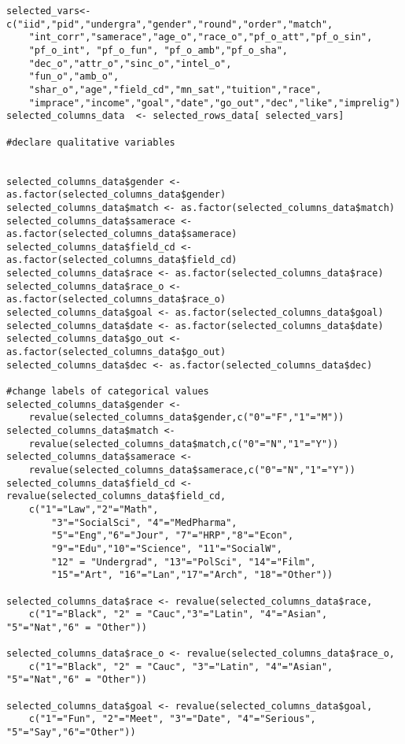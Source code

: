 \begin{verbatim}
selected_vars<-c("iid","pid","undergra","gender","round","order","match",
    "int_corr","samerace","age_o","race_o","pf_o_att","pf_o_sin",
    "pf_o_int", "pf_o_fun", "pf_o_amb","pf_o_sha",
    "dec_o","attr_o","sinc_o","intel_o",
    "fun_o","amb_o",
    "shar_o","age","field_cd","mn_sat","tuition","race",
    "imprace","income","goal","date","go_out","dec","like","imprelig")
selected_columns_data  <- selected_rows_data[ selected_vars]

#declare qualitative variables


selected_columns_data$gender <- as.factor(selected_columns_data$gender)
selected_columns_data$match <- as.factor(selected_columns_data$match)
selected_columns_data$samerace <- as.factor(selected_columns_data$samerace)
selected_columns_data$field_cd <- as.factor(selected_columns_data$field_cd)
selected_columns_data$race <- as.factor(selected_columns_data$race)
selected_columns_data$race_o <- as.factor(selected_columns_data$race_o)
selected_columns_data$goal <- as.factor(selected_columns_data$goal)
selected_columns_data$date <- as.factor(selected_columns_data$date)
selected_columns_data$go_out <- as.factor(selected_columns_data$go_out)
selected_columns_data$dec <- as.factor(selected_columns_data$dec)

#change labels of categorical values
selected_columns_data$gender <- 
    revalue(selected_columns_data$gender,c("0"="F","1"="M"))
selected_columns_data$match <- 
    revalue(selected_columns_data$match,c("0"="N","1"="Y"))
selected_columns_data$samerace <- 
    revalue(selected_columns_data$samerace,c("0"="N","1"="Y"))
selected_columns_data$field_cd <- revalue(selected_columns_data$field_cd,
    c("1"="Law","2"="Math", 
        "3"="SocialSci", "4"="MedPharma", 
        "5"="Eng","6"="Jour", "7"="HRP","8"="Econ",
        "9"="Edu","10"="Science", "11"="SocialW",
        "12" = "Undergrad", "13"="PolSci", "14"="Film",
        "15"="Art", "16"="Lan","17"="Arch", "18"="Other"))
        
selected_columns_data$race <- revalue(selected_columns_data$race,
    c("1"="Black", "2" = "Cauc","3"="Latin", "4"="Asian", "5"="Nat","6" = "Other"))
    
selected_columns_data$race_o <- revalue(selected_columns_data$race_o,
    c("1"="Black", "2" = "Cauc", "3"="Latin", "4"="Asian", "5"="Nat","6" = "Other"))
    
selected_columns_data$goal <- revalue(selected_columns_data$goal, 
    c("1"="Fun", "2"="Meet", "3"="Date", "4"="Serious", "5"="Say","6"="Other"))


\end{verbatim}
